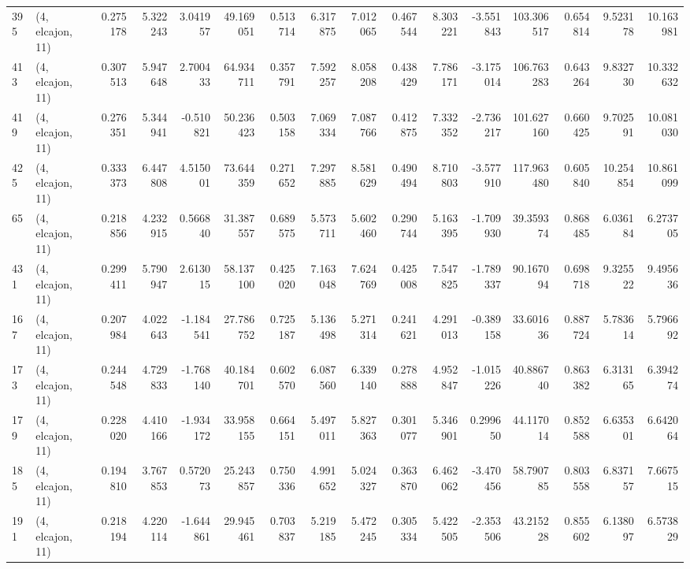 \begin{tabular}{llrrrrrrrrrrrrrr}
395 &  (4, elcajon, 11) &   0.275178 &   5.322243 &   3.041957 &    49.169051 &   0.513714 &   6.317875 &   7.012065 &  0.467544 &   8.303221 &  -3.551843 &   103.306517 &   0.654814 &   9.523178 &  10.163981 \\
413 &  (4, elcajon, 11) &   0.307513 &   5.947648 &   2.700433 &    64.934711 &   0.357791 &   7.592257 &   8.058208 &  0.438429 &   7.786171 &  -3.175014 &   106.763283 &   0.643264 &   9.832730 &  10.332632 \\
419 &  (4, elcajon, 11) &   0.276351 &   5.344941 &  -0.510821 &    50.236423 &   0.503158 &   7.069334 &   7.087766 &  0.412875 &   7.332352 &  -2.736217 &   101.627160 &   0.660425 &   9.702591 &  10.081030 \\
425 &  (4, elcajon, 11) &   0.333373 &   6.447808 &   4.515001 &    73.644359 &   0.271652 &   7.297885 &   8.581629 &  0.490494 &   8.710803 &  -3.577910 &   117.963480 &   0.605840 &  10.254854 &  10.861099 \\
65  &  (4, elcajon, 11) &   0.218856 &   4.232915 &   0.566840 &    31.387557 &   0.689575 &   5.573711 &   5.602460 &  0.290744 &   5.163395 &  -1.709930 &    39.359374 &   0.868485 &   6.036184 &   6.273705 \\
431 &  (4, elcajon, 11) &   0.299411 &   5.790947 &   2.613015 &    58.137100 &   0.425020 &   7.163048 &   7.624769 &  0.425008 &   7.547825 &  -1.789337 &    90.167094 &   0.698718 &   9.325522 &   9.495636 \\
167 &  (4, elcajon, 11) &   0.207984 &   4.022643 &  -1.184541 &    27.786752 &   0.725187 &   5.136498 &   5.271314 &  0.241621 &   4.291013 &  -0.389158 &    33.601636 &   0.887724 &   5.783614 &   5.796692 \\
173 &  (4, elcajon, 11) &   0.244548 &   4.729833 &  -1.768140 &    40.184701 &   0.602570 &   6.087560 &   6.339140 &  0.278888 &   4.952847 &  -1.015226 &    40.886740 &   0.863382 &   6.313165 &   6.394274 \\
179 &  (4, elcajon, 11) &   0.228020 &   4.410166 &  -1.934172 &    33.958155 &   0.664151 &   5.497011 &   5.827363 &  0.301077 &   5.346901 &   0.299650 &    44.117014 &   0.852588 &   6.635301 &   6.642064 \\
185 &  (4, elcajon, 11) &   0.194810 &   3.767853 &   0.572073 &    25.243857 &   0.750336 &   4.991652 &   5.024327 &  0.363870 &   6.462062 &  -3.470456 &    58.790785 &   0.803558 &   6.837157 &   7.667515 \\
191 &  (4, elcajon, 11) &   0.218194 &   4.220114 &  -1.644861 &    29.945461 &   0.703837 &   5.219185 &   5.472245 &  0.305334 &   5.422505 &  -2.353506 &    43.215228 &   0.855602 &   6.138097 &   6.573829 \\

\end{tabular}
